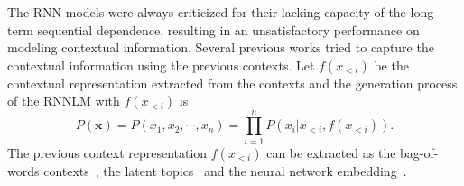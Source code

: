 \documentclass[a4paper]{article}
\begin{document}
\iffalse
\begin{figure*}[htbp]
\centering
\subfigure[Sentence-level RNN-LM]{ \label{fig:rnn-lm}  \texttt{[image: graph/rnn.pdf]}} \hspace{.5in}
\subfigure[Contextual RNN-LM]{ \label{fig:contextual-lm}  \texttt{[image: graph/crnn.pdf]}} \hspace{.5in}
\subfigure[RNN-LM with semantic attribute attention]{\label{fig:mm-lm}  \texttt{[image: graph/mmrnn.pdf]}}
\caption{Language Model Structures} \label{fig:model}  \end{figure*}

\begin{figure*}[ht]\centering
    {
    \texttt{[image: graph/model\_c.pdf]}
    }
    \caption{An AlphaGo News from NY Times with different attributes}
    \label{fig:model}
\end{figure*}
\fi
The RNN models were always criticized for their lacking capacity of the long-term sequential dependence, resulting in an unsatisfactory performance on modeling contextual information. Several previous works tried to capture the contextual information using the previous contexts.
Let $f(x_{<i})$ be the contextual representation extracted from the contexts and the generation process of the RNNLM with $f(x_{<i})$ is
\begin{equation}
P(\mathbf{x})=P(x_1,x_2,\cdots,x_n)=\prod_{i=1}^{n}P(x_i|x_ {<i},f(x_{<i})).
\end{equation}
The previous context representation $f({x_{<i}})$ can be extracted as the bag-of-words contexts~\cite{wang2016larger-context}, the latent topics~\cite{mikolov2012context} and the neural network embedding~\cite{ji2015document}.


\iffalse
\end{document}
